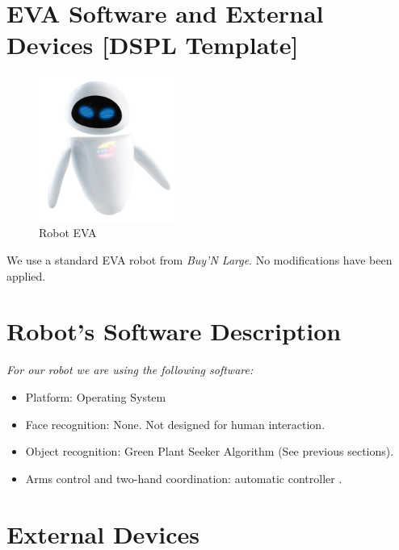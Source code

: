 \section*{EVA Software and External Devices [DSPL Template]}

\setlength\intextsep{0pt}
\begin{figure}
	\centering
	\includegraphics[width=0.4\textwidth]{images/eva.png}
	\caption{Robot EVA}
	\label{fig:eva}
\end{figure}

We use a standard EVA robot from \textit{Buy'N Large}. No modifications have been applied.

\section*{Robot's Software Description}

\textit{For our robot we are using the following software:}

\begin{itemize}
	\item Platform: \BnL Operating System
	\item Face recognition: None. Not designed for human interaction.
	\item Object recognition: \BnL Green Plant Seeker Algorithm (See previous sections).
	\item Arms control and two-hand coordination: \BnL automatic controller \cite{bnl2}.
\end{itemize}

\section*{External Devices}

